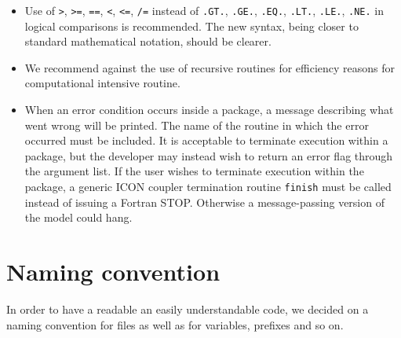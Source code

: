 \documentclass[a4paper,11pt,DIV16,BCOR1cm,titlepage]{scrartcl}
\begin{document}
\begin{itemize} 
\item  Use of \texttt{>}, \texttt{>=}, \texttt{==}, \texttt{<}, \texttt{<=},  
\texttt{/=} instead of \texttt{.GT.}, \texttt{.GE.}, \texttt{.EQ.},  
\texttt{.LT.}, \texttt{.LE.}, \texttt{.NE.} in logical comparisons is  
recommended. The new syntax, being closer to standard mathematical  
notation, should be clearer.

\item  
We recommend against the use of recursive routines for efficiency  
reasons for computational intensive routine.

\item When an error condition occurs inside a package, a
  message describing what went wrong will be printed. The name of the
  routine in which the error occurred must be included. It is
  acceptable to terminate execution within a package, but the
  developer may instead wish to return an error flag through the
  argument list.  If the user wishes to terminate execution within the
  package, a generic ICON coupler termination routine {\tt finish}
  must be called instead of issuing a Fortran STOP. Otherwise a
  message-passing version of the model could hang.

\end{itemize}  

%
\section{Naming convention}\label{sec_gvn}    
%
In order to have a readable an easily understandable code, we decided on a 
naming convention for files as well as for variables, prefixes and so on.
%
\end{document}
